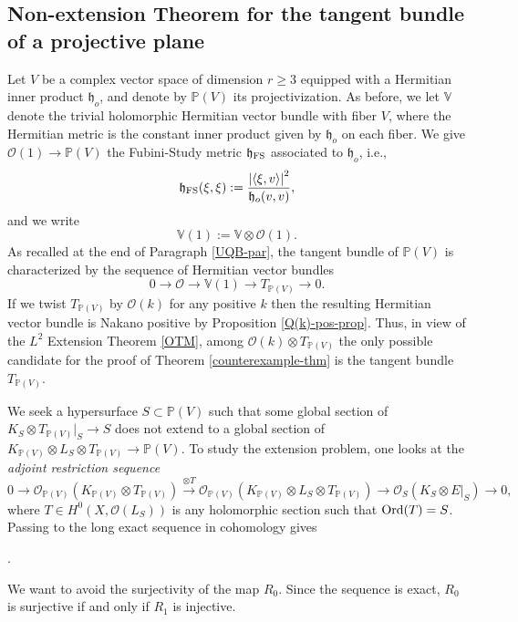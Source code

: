 \documentclass[12pt,hidelinks]{amsart}
\newcommand{\cO}{{\mathcal O}}
\newcommand{\fh}{{\mathfrak h}}
\newcommand{\bbP}{{\mathbb P}}
\newcommand{\bbV}{{\mathbb V}}
\newcommand{\tensor}{\otimes}
\begin{document}
\subsection{Non-extension Theorem for the tangent bundle of a projective plane}
Let $V$ be a complex vector space of dimension $r \ge 3$ equipped with a Hermitian inner product $\fh _o$, and denote by $\bbP(V)$ its projectivization.  As before, we let $\bbV$ denote the trivial holomorphic Hermitian vector bundle with fiber $V$, where the Hermitian metric is the constant inner product given by $\fh_o$ on each fiber.  We give $\cO (1) \to \bbP (V)$ the Fubini-Study metric $\fh _{\rm FS}$ associated to $\fh _o$, i.e., 
\[
\fh _{\rm FS} (\xi, \xi) := \frac{\left | \left < \xi, v\right >\right |^2}{\fh _o(v,v)},
\]
and we write 
\[
\bbV(1) := \bbV \tensor \cO (1).
\]
As recalled at the end of Paragraph \ref{UQB-par}, the tangent bundle of $\bbP(V)$ is characterized by the sequence of Hermitian vector bundles 
\begin{equation}\label{TP-seq-0}
0 \to \cO \to \bbV(1) \to T_{\bbP(V)} \to 0.
\end{equation}
If we twist $T_{\bbP (V)}$ by $\cO (k)$ for any positive $k$ then the resulting Hermitian vector bundle is Nakano positive by Proposition \ref{Q(k)-pos-prop}.  Thus, in view of the $L^2$ Extension Theorem \ref{OTM}, among $\cO (k) \tensor T_{\bbP(V)}$ the only possible candidate for the proof of Theorem \ref{counterexample-thm}  is the tangent bundle $T_{\bbP (V)}$.

We seek a hypersurface $S \subset \bbP (V)$ such that some global section of $K_{S} \tensor T_{\bbP(V)}|_S \to S$ does not extend to a global section of $K_{\bbP(V)} \tensor L_S \tensor T_{\bbP(V)} \to \bbP (V)$.  To study the extension problem, one looks at the \emph{adjoint restriction sequence}
\[
0 \to  \cO_{\bbP(V)}(K_{\bbP(V)} \tensor T_{\bbP(V)}) \stackrel{\tensor T}{\to} \cO_{\bbP(V)} (K_{\bbP(V)} \tensor L_S \tensor T_{\bbP(V)}) \to \cO_S (K_S \tensor E|_S) \to 0,
\]
where $T \in H^0(X, \cO (L_S))$ is any holomorphic section such that ${\rm Ord}(T) = S$.  Passing to the long exact sequence in cohomology gives
\begin{center}
.
\end{center}
We want to avoid the surjectivity of the map $R_0$.  Since the sequence is exact, $R_0$ is surjective if and only if $R_1$ is injective.  
\end{document}
